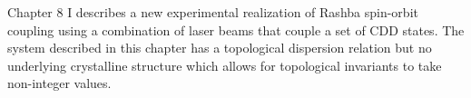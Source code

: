 Chapter 8 I describes a new experimental realization of Rashba spin-orbit coupling using a combination of laser beams that couple a set of CDD states. The system described in this chapter has a topological dispersion relation but no underlying crystalline structure which allows for topological invariants to take non-integer values. 













